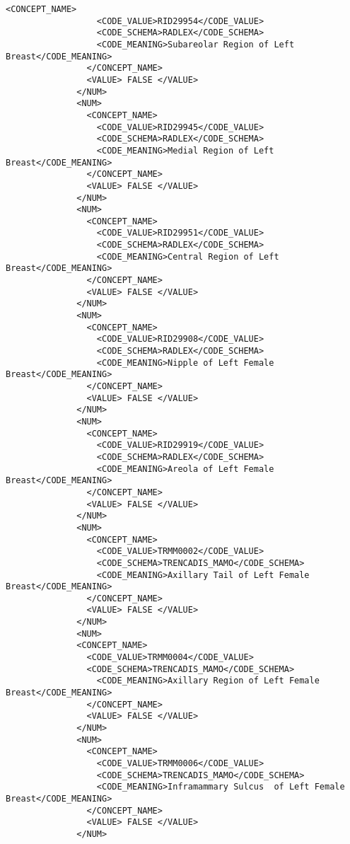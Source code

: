\begin{lstlisting}[label=dicom-report,caption=Informe estructurado de una exploración de mama]
                <CONCEPT_NAME>
                  <CODE_VALUE>RID29954</CODE_VALUE>
                  <CODE_SCHEMA>RADLEX</CODE_SCHEMA>
                  <CODE_MEANING>Subareolar Region of Left Breast</CODE_MEANING>
                </CONCEPT_NAME>
                <VALUE> FALSE </VALUE>
              </NUM>
              <NUM>
                <CONCEPT_NAME>
                  <CODE_VALUE>RID29945</CODE_VALUE>
                  <CODE_SCHEMA>RADLEX</CODE_SCHEMA>
                  <CODE_MEANING>Medial Region of Left Breast</CODE_MEANING>
                </CONCEPT_NAME>
                <VALUE> FALSE </VALUE>
              </NUM>
              <NUM>
                <CONCEPT_NAME>
                  <CODE_VALUE>RID29951</CODE_VALUE>
                  <CODE_SCHEMA>RADLEX</CODE_SCHEMA>
                  <CODE_MEANING>Central Region of Left Breast</CODE_MEANING>
                </CONCEPT_NAME>
                <VALUE> FALSE </VALUE>
              </NUM>
              <NUM>
                <CONCEPT_NAME>
                  <CODE_VALUE>RID29908</CODE_VALUE>
                  <CODE_SCHEMA>RADLEX</CODE_SCHEMA>
                  <CODE_MEANING>Nipple of Left Female Breast</CODE_MEANING>
                </CONCEPT_NAME>
                <VALUE> FALSE </VALUE>
              </NUM>
              <NUM>
                <CONCEPT_NAME>
                  <CODE_VALUE>RID29919</CODE_VALUE>
                  <CODE_SCHEMA>RADLEX</CODE_SCHEMA>
                  <CODE_MEANING>Areola of Left Female Breast</CODE_MEANING>
                </CONCEPT_NAME>
                <VALUE> FALSE </VALUE>
              </NUM>
              <NUM>
                <CONCEPT_NAME>
                  <CODE_VALUE>TRMM0002</CODE_VALUE>
                  <CODE_SCHEMA>TRENCADIS_MAMO</CODE_SCHEMA>
                  <CODE_MEANING>Axillary Tail of Left Female Breast</CODE_MEANING>
                </CONCEPT_NAME>
                <VALUE> FALSE </VALUE>
              </NUM>
              <NUM>
              <CONCEPT_NAME>
                <CODE_VALUE>TRMM0004</CODE_VALUE>
                <CODE_SCHEMA>TRENCADIS_MAMO</CODE_SCHEMA>
                  <CODE_MEANING>Axillary Region of Left Female Breast</CODE_MEANING>
                </CONCEPT_NAME>
                <VALUE> FALSE </VALUE>
              </NUM>
              <NUM>
                <CONCEPT_NAME>
                  <CODE_VALUE>TRMM0006</CODE_VALUE>
                  <CODE_SCHEMA>TRENCADIS_MAMO</CODE_SCHEMA>
                  <CODE_MEANING>Inframammary Sulcus  of Left Female Breast</CODE_MEANING>
                </CONCEPT_NAME>
                <VALUE> FALSE </VALUE>
              </NUM>

\end{lstlisting}

